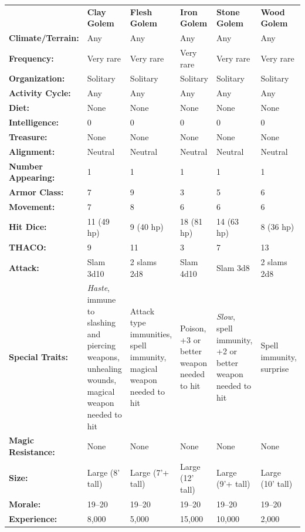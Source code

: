 \begin{minipage}{\columnwidth}
\noindent \begin{tabular}{p{}g{.13\columnwidth}p{.14\columnwidth}g{.14\columnwidth}p{.13\columnwidth}g{.13\columnwidth}}
	& \textbf{Clay Golem}	& \textbf{Flesh Golem}	& \textbf{Iron Golem}	& \textbf{Stone Golem}	& \textbf{Wood Golem}	\\
\textbf{Climate/Terrain:}	& Any	& Any	& Any	& Any	& Any	\\
\textbf{Frequency:} 		& Very rare	& Very rare	& Very rare	& Very rare	& Very rare	\\
\textbf{Organization:} 		& Solitary	& Solitary	& Solitary	& Solitary	& Solitary	\\
\textbf{Activity Cycle:} 	& Any	& Any	& Any	& Any	& Any	\\
\textbf{Diet:} 				& None	& None	& None	& None	& None	\\
\textbf{Intelligence:} 		& 0	& 0	& 0	& 0	& 0	\\
\textbf{Treasure:} 			& None	& None	& None	& None	& None	\\
\textbf{Alignment:} 		& Neutral	& Neutral	& Neutral	& Neutral	& Neutral	\\
\hline
\textbf{Number Appearing:} 	& 1	& 1	& 1	& 1	& 1	\\
\textbf{Armor Class:} 		& 7	& 9	& 3	& 5	& 6	\\
\textbf{Movement:} 			& 7	& 8	& 6	& 6	& 6	\\
\textbf{Hit Dice:} 			& 11 (49 hp)	& 9 (40 hp)	& 18 (81 hp)	& 14 (63 hp)	& 8 (36 hp)	\\
\textbf{THACO:} 			& 9	& 11	& 3	& 7	& 13	\\
\textbf{Attack:} 			& Slam 3d10	& 2 slams 2d8	& Slam 4d10	& Slam 3d8	& 2 slams 2d8	\\
\textbf{Special Traits:} & \textit{Haste}, immune to slashing and piercing weapons, unhealing wounds, magical weapon needed to hit	& Attack type immunities, spell immunity, magical weapon needed to hit	& Poison, +3 or better weapon needed to hit	& \textit{Slow}, spell immunity, +2 or better weapon needed to hit	& Spell immunity, surprise	\\
\textbf{Magic Resistance:} 	& None	& None	& None	& None	& None	\\
\textbf{Size:} 				& Large (8' tall)	& Large (7'+ tall)	& Large (12' tall)	& Large (9'+ tall)	& Large (10' tall)	\\
\textbf{Morale:} 			& 19--20	& 19--20	& 19--20	& 19--20	& 19--20	\\
\textbf{Experience:} 		& 8,000	& 5,000	& 15,000	& 10,000	& 2,000	\\ %
\end{tabular}

\end{minipage}

